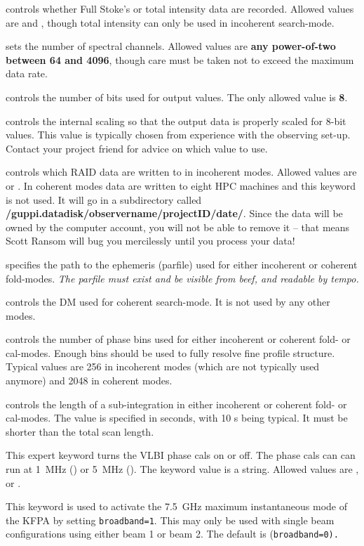 \begin{description}[font=\bfseries\large,leftmargin=*]
\item[guppi.polnmode] controls whether Full Stoke's or total
    intensity data are recorded.  Allowed values are
     and ,
    though total intensity can only be used in incoherent search-mode.
\item[guppi.numchan] sets the number of spectral channels.
    Allowed values are \textbf{any power-of-two between 64 and 4096},
    though care must be taken not to exceed the maximum data rate.
\item[guppi.outbits] controls the number of bits used for
    output values.  The only allowed value is \textbf{8}.
\item[guppi.scale] controls the internal scaling so that the
    output data is properly scaled for 8-bit values.  This value is
    typically chosen from experience with the observing set-up.
    Contact your project friend for advice on which value to use.
\item[guppi.datadisk] controls which RAID data are written to
    in incoherent modes.  Allowed values are  or
    . In coherent modes data are written to eight
    HPC machines and this keyword is not used. It will go in a subdirectory
    called {\bf /guppi.datadisk/observername/projectID/date/}.
    Since the data will be owned by the  computer account,
    you will not be able to remove it -- that means Scott Ransom will bug
    you mercilessly until you process your data!
\item[guppi.fold\_parfile] specifies the path to the ephemeris
    (parfile) used for either incoherent or coherent fold-modes.
    \emph{The parfile must exist and be visible from beef, and readable by tempo.}
\item[guppi.dm] controls the DM used for coherent search-mode.  It is not
     used by any other modes.
\item[guppi.fold\_bins] controls the number of phase bins used
    for either incoherent or coherent fold- or cal-modes.  Enough bins
    should be used to fully resolve fine profile structure.  Typical
    values are 256 in incoherent modes (which are not typically used
    anymore) and 2048 in coherent modes.
\item[guppi.fold\_dumptime] controls the length of a
    sub-integration in either incoherent or coherent fold- or
    cal-modes.  The value is specified in seconds, with 10 s being
    typical.  It must be shorter than the total scan length.
\item[vlbi.phasecal] This expert keyword turns the \gls{VLBI} phase
cals on or off.  The phase cals can can run at 1~MHz () or
5~MHz (). The keyword value is a string.  Allowed values are
,  or .
\item[broadband] This keyword is used to activate the 
7.5~GHz maximum instantaneous mode of the \gls{KFPA} by setting
{\tt broadband=1}.  This may only be used with single beam configurations
using either beam 1 or beam 2.  The default is  (\tt broadband=0).

\end{description}

